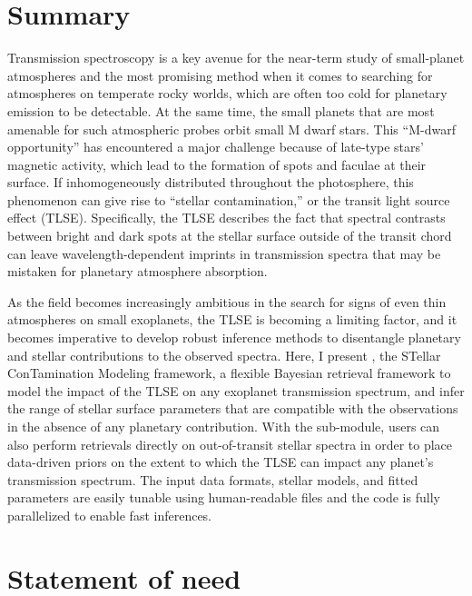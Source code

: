 \documentclass[10pt,a4paper,onecolumn]{article}
\let\textttOrig=\texttt
\def\texttt#1{\expandafter\textttOrig{\seqsplit{#1}}}
\begin{document}
\hypertarget{summary}{%
\section{Summary}\label{summary}}

Transmission spectroscopy is a key avenue for the near-term study of
small-planet atmospheres and the most promising method when it comes to
searching for atmospheres on temperate rocky worlds, which are often too
cold for planetary emission to be detectable. At the same time, the
small planets that are most amenable for such atmospheric probes orbit
small M dwarf stars. This ``M-dwarf opportunity'' has encountered a
major challenge because of late-type stars' magnetic activity, which
lead to the formation of spots and faculae at their surface. If
inhomogeneously distributed throughout the photosphere, this phenomenon
can give rise to ``stellar contamination,'' or the transit light source
effect (TLSE). Specifically, the TLSE describes the fact that spectral
contrasts between bright and dark spots at the stellar surface outside
of the transit chord can leave wavelength-dependent imprints in
transmission spectra that may be mistaken for planetary atmosphere
absorption.

As the field becomes increasingly ambitious in the search for signs of
even thin atmospheres on small exoplanets, the TLSE is becoming a
limiting factor, and it becomes imperative to develop robust inference
methods to disentangle planetary and stellar contributions to the
observed spectra. Here, I present \texttt{stctm}, the STellar
ConTamination Modeling framework, a flexible Bayesian retrieval
framework to model the impact of the TLSE on any exoplanet transmission
spectrum, and infer the range of stellar surface parameters that are
compatible with the observations in the absence of any planetary
contribution. With the \texttt{exotune} sub-module, users can also
perform retrievals directly on out-of-transit stellar spectra in order
to place data-driven priors on the extent to which the TLSE can impact
any planet's transmission spectrum. The input data formats, stellar
models, and fitted parameters are easily tunable using human-readable
files and the code is fully parallelized to enable fast inferences.

\hypertarget{statement-of-need}{%
\section{Statement of need}\label{statement-of-need}}
\end{document}
